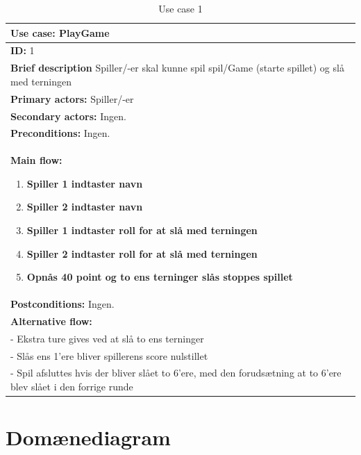 \begin{table}[H]
    \begin{center}
        \begin{tabular}{ | p{15cm} |}
            \hline
            \textbf{Use case:} PlayGame \\ \hline
            \textbf{ID:} 1 \\ \hline
            \textbf{Brief description} Spiller/-er skal kunne spil spil/Game (starte spillet) og slå med terningen     \\ \hline
            \textbf{Primary actors:} Spiller/-er \\ \hline
            \textbf{Secondary actors:} Ingen. \\ \hline
            \textbf{Preconditions:} Ingen.     \\ \hline
            \textbf{Main flow:}
            \begin{enumerate}
                \item \textbf{Spiller 1 indtaster navn}
                \item \textbf{Spiller 2 indtaster navn}
                \item \textbf{Spiller 1 indtaster roll for at slå med terningen}
                \item \textbf{Spiller 2 indtaster roll for at slå med terningen}
                \item \textbf{Opnås 40 point og to ens terninger slås stoppes spillet}    
            \end{enumerate} \\ \hline
            \textbf{Postconditions:} Ingen.\\ \hline
            \textbf{Alternative flow:}
            \\- Ekstra ture gives ved at slå to ens terninger
            \\- Slås ens 1’ere bliver spillerens score nulstillet
            \\- Spil afsluttes hvis der bliver slået to 6’ere, med den forudsætning at to 6’ere blev slået i den forrige runde  \\ \hline
            \hline
        \end{tabular}
        \caption{Use case 1}
        \label{usecase:1}
    \end{center}
\end{table}

\section{Domænediagram}

